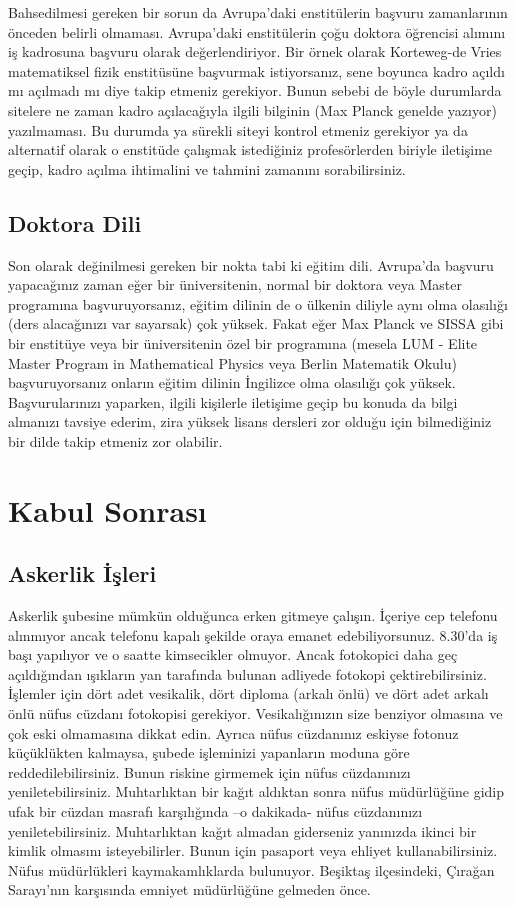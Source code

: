 \documentclass[12pt]{article}
\theoremstyle{break}
\begin{document}
Bahsedilmesi gereken bir sorun da Avrupa'daki enstitülerin başvuru zamanlarının önceden belirli olmaması. Avrupa'daki enstitülerin çoğu doktora öğrencisi alımını iş kadrosuna başvuru olarak değerlendiriyor. Bir örnek olarak Korteweg-de Vries matematiksel fizik enstitüsüne başvurmak istiyorsanız, sene boyunca kadro açıldı mı açılmadı mı diye takip etmeniz gerekiyor. Bunun sebebi de böyle durumlarda sitelere ne zaman kadro açılacağıyla ilgili bilginin (Max Planck genelde yazıyor) yazılmaması. Bu durumda ya sürekli siteyi kontrol etmeniz gerekiyor ya da alternatif olarak o enstitüde çalışmak istediğiniz profesörlerden biriyle iletişime geçip, kadro açılma ihtimalini ve tahmini zamanını sorabilirsiniz. 

\subsection{Doktora Dili}

Son olarak değinilmesi gereken bir nokta tabi ki eğitim dili. Avrupa'da başvuru yapacağınız zaman eğer bir üniversitenin, normal bir doktora veya Master programına başvuruyorsanız, eğitim dilinin de o ülkenin diliyle aynı olma olasılığı (ders alacağınızı var sayarsak) çok yüksek. Fakat eğer Max Planck ve SISSA gibi bir enstitüye veya bir üniversitenin özel bir programına (mesela LUM - Elite Master Program in Mathematical Physics veya Berlin Matematik Okulu) başvuruyorsanız onların eğitim dilinin İngilizce olma olasılığı çok yüksek. Başvurularınızı yaparken, ilgili kişilerle iletişime geçip bu konuda da bilgi almanızı tavsiye ederim, zira yüksek lisans dersleri zor olduğu için bilmediğiniz bir dilde takip etmeniz zor olabilir. 

%
%
\section{Kabul Sonrası}
\subsection{Askerlik İşleri}

Askerlik şubesine mümkün olduğunca erken gitmeye çalışın. İçeriye cep telefonu alınmıyor ancak telefonu kapalı şekilde oraya emanet edebiliyorsunuz. 8.30’da iş başı yapılıyor ve o saatte kimsecikler olmuyor. Ancak fotokopici daha geç açıldığından ışıkların yan tarafında bulunan adliyede fotokopi çektirebilirsiniz. İşlemler için dört adet vesikalik, dört diploma (arkalı önlü) ve dört adet arkalı önlü nüfus cüzdanı fotokopisi gerekiyor. Vesikalığınızın size benziyor olmasına ve çok eski olmamasına dikkat edin. Ayrıca nüfus cüzdanınız eskiyse fotonuz küçüklükten kalmaysa, şubede işleminizi yapanların moduna göre reddedilebilirsiniz. Bunun riskine girmemek için nüfus cüzdanınızı yeniletebilirsiniz. Muhtarlıktan bir kağıt aldıktan sonra nüfus müdürlüğüne gidip ufak bir cüzdan masrafı karşılığında –o dakikada- nüfus cüzdanınızı yeniletebilirsiniz. Muhtarlıktan kağıt almadan giderseniz yanınızda ikinci bir kimlik olmasını isteyebilirler. Bunun için pasaport veya ehliyet kullanabilirsiniz. Nüfus müdürlükleri kaymakamlıklarda bulunuyor. Beşiktaş ilçesindeki, Çırağan Sarayı’nın karşısında emniyet müdürlüğüne gelmeden önce. 
\end{document}
